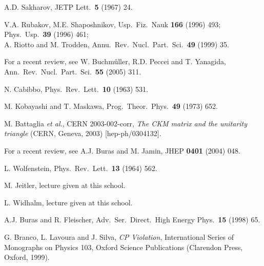 \documentclass[11pt]{cernrep}
\begin{document}
\begin{thebibliography}{999}
A.D. Sakharov,
 { JETP Lett.}~{\bf 5} (1967) 24.
  
V.A. Rubakov, M.E. Shaposhnikov, 
{ Usp.\ Fiz.\ Nauk} {\bf 166} (1996) 493; 
{ Phys.\ Usp.}~{\bf 39} (1996) 461;\\
A. Riotto and M. Trodden, { Annu.\ Rev.\ Nucl.\ Part.\ 
Sci.}~{\bf 49} (1999) 35.

For a recent review, see W. Buchm\"uller, R.D. Peccei 
and T. Yanagida,
  Ann.\ Rev.\ Nucl.\ Part.\ Sci.\  {\bf 55} (2005) 311.

N. Cabibbo,
  { Phys.\ Rev.\ Lett.}~{\bf 10} (1963) 531.

M. Kobayashi and T. Maskawa,
{ Prog.\ Theor.\ Phys.}~{\bf 49} (1973) 652.

M. Battaglia {\it et al.}, CERN 2003-002-corr,
{\it The CKM matrix and the unitarity triangle}
(CERN, Geneva, 2003) [hep-ph/0304132].

For a recent review, see A.J. Buras and M. Jamin,
  { JHEP} {\bf 0401} (2004) 048.

L. Wolfenstein,
  { Phys.\ Rev.\ Lett.}~{\bf 13} (1964) 562.
  
M. Jeitler, lecture given at this school.

L. Widhalm, lecture given at this school.

  A.J. Buras and R. Fleischer,
Adv.\ Ser.\ Direct.\ High Energy Phys.\  {\bf 15} (1998) 65.

G. Branco, L. Lavoura 
and J. Silva,  {\it CP Violation}, International Series of Monographs on 
Physics 103, Oxford Science Publications (Clarendon Press, Oxford, 1999).


\end{thebibliography}
\end{document}
